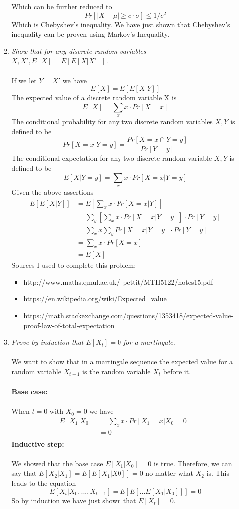 \documentclass[12pt]{article}
\begin{document}
\begin{enumerate}
\begin{enumerate}
		Which can be further reduced to 
			$$
			Pr[|X-\mu| \ge c \cdot \sigma] \le 1/c^2
			$$ 
		Which is Chebyshev's inequality.  We have just shown that Chebyshev's inequality can be proven using Markov's Inequality.
		\newpage
		\item \textit{Show that for any discrete random variables $X,X',E[X] = E[E[X|X']]$.}\\
		\\
		If we let $Y = X'$ we have
			$$
			E[X] = E[E[X|Y]]
			$$
		The expected value of a discrete random variable X is
			$$
			E[X] = \sum_{x} x \cdot Pr[X=x]
			$$
		The conditional probability for any two discrete random variables $X,Y$ is defined to be 
			$$
			Pr[X=x|Y=y] = \frac{Pr[X=x \cap Y=y]}{Pr[Y=y]}
			$$
		The conditional expectation for any two discrete random variable $X,Y$ is defined to be
			$$
			E[X|Y=y] = \sum_{x} x \cdot Pr[X=x|Y=y]
			$$
		Given the above assertions
			\begin{align*}
				E[E[X|Y]] &= E[\sum_{x} x \cdot Pr[X=x|Y]]\\
				&=\sum_{y} [\sum_{x} x \cdot Pr[X=x|Y=y]] \cdot Pr[Y=y]\\
				&=\sum_{x} x \sum_{y} Pr[X=x|Y=y] \cdot Pr[Y=y]\\
				&=\sum_{x} x \cdot Pr[X=x]\\
				&=E[X]
			\end{align*}
		Sources I used to complete this problem:
		\begin{itemize}
			\item http://www.maths.qmul.ac.uk/~pettit/MTH5122/notes15.pdf
			\item https://en.wikipedia.org/wiki/Expected\_value
			\item https://math.stackexchange.com/questions/1353418/expected-value-proof-law-of-total-expectation
		\end{itemize}
		
		\newpage
		\item \textit{Prove by induction that $E[X_t] = 0$ for a martingale.}\\
		\\
		We want to show that in a martingale sequence the expected value for a random variable $X_{t+1}$ is the random variable $X_t$ before it.\\
		\\
		\textbf{Base case: }\\
		\\
		When $t=0$ with $X_0 = 0$ we have
			\begin{align*}
			E[X_1|X_0] &= \sum_{x} x \cdot Pr[X_1=x|X_0 = 0]\\
			&=0\\
			\end{align*}
		\textbf{Inductive step: }\\
		\\
		We showed that the base case $E[X_1|X_0] = 0$ is true.  Therefore, we can say that $E[X_2|X_1] = E[E[X_1|X0]] = 0$ no matter what $X_2$ is.   This leads to the equation
			$$
			E[X_t|X_0,...,X_{t-1}] = E[E[...E[X_{1}|X_{0}]]] = 0
			$$
		So by induction we have just shown that $E[X_t] = 0$.
		

\end{enumerate}
\end{enumerate}
\end{document}
